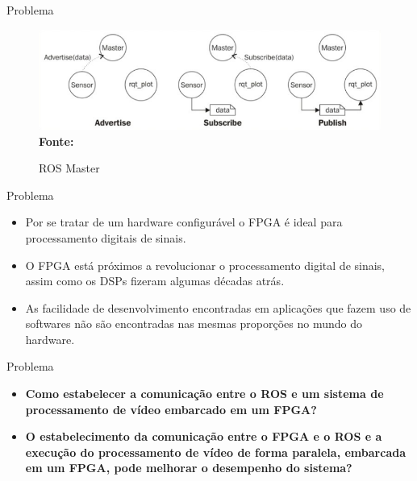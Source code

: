 \documentclass[10pt]{beamer}
\begin{document}
{
\begin{frame}[fragile]{Problema}

\begin{figure}[h]
	\caption{ROS Master}
	\begin{center}
		\includegraphics[scale=0.71]{rosMaster.png}\\
		{\small \textbf{Fonte:}\cite{ROSeffect}}
\end{center}
\label{fig:rosmaster}
\end{figure}

\end{frame}
}

{
\begin{frame}[fragile]{Problema}
    \begin{itemize}
        \item Por se tratar de um hardware configurável o FPGA é ideal para processamento digitais de sinais.
        \item O FPGA está próximos a revolucionar o processamento digital de sinais, assim como os DSPs fizeram algumas décadas atrás.
        \item As facilidade de desenvolvimento encontradas em aplicações que fazem uso de softwares não são encontradas nas mesmas proporções no mundo do hardware.
    \end{itemize}
\end{frame}
}


{
\begin{frame}[fragile]{Problema}
	\begin{itemize}
		\item \textbf{Como estabelecer a comunicação entre o ROS e um sistema de processamento de vídeo embarcado em um FPGA? }
	\end{itemize}
	\begin{itemize}
		\item \textbf{O estabelecimento da comunicação entre o FPGA e o ROS e a execução do processamento de vídeo de forma paralela, embarcada em um FPGA, pode melhorar o desempenho do sistema?}
	\end{itemize}
\end{frame}
}
\end{document}

